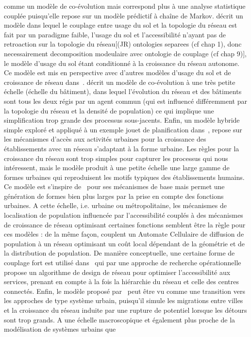 {comme un modèle de co-évolution mais correspond plus à une analyse statistique couplée  puisqu'elle repose sur un modèle prédictif à chaîne de Markov. \cite{rui2011urban} décrit un modèle dans lequel le couplage entre usage du sol et la topologie du réseau est fait par un paradigme faible, l'usage du sol et l'accessibilité n'ayant pas de retroaction sur la topologie du réseau[(JR) ontologies separees (cf chap 1), donc necessairement decomposition modeulaire avec ontologie de couplage (cf chap 9)], le modèle d'usage du sol étant conditionné à la croissance du réseau autonome. Ce modèle est mis en perspective avec d'autres modèles d'usage du sol et de croissance de réseau dans~\cite{rui2013urban}. \cite{achibet2014model} décrit un modèle de co-évolution à une très petite échelle (échelle du bâtiment), dans lequel l'évolution du réseau et des bâtiments sont tous les deux régis par un agent commun (qui est influencé différemment par la topologie du réseau et la densité de population) ce qui implique une simplification trop grande des processus sous-jacents. Enfin, un modèle hybride simple exploré et appliqué à un exemple jouet de planification dans~\cite{raimbault2014hybrid}, repose sur les mécanismes d'accès aux activités urbaines pour la croissance des établissements avec un réseau s'adaptant à la forme urbaine. Les règles pour la croissance du réseau sont trop simples pour capturer les processus qui nous intéressent, mais le modèle produit à une petite échelle une large gamme de formes urbaines qui reproduisent les motifs typiques des établissements humains. Ce modèle est s'inspire de~\cite{moreno2012automate} pour ses mécanismes de base mais permet une génération de formes bien plus larges par la prise en compte des fonctions urbaines. A cette échelle, i.e. urbaine ou métropolitaine, les mécanismes de localisation de population influencée par l'accessibilité couplés à des mécanismes de croissance de réseau optimisant certaines fonctions semblent être la règle pour ces modèles : de la même façon, \cite{wu2017city} couplent un Automate Cellulaire de diffusion de population à un réseau optimisant un coût local dépendant de la géométrie et de la distribution de population. De manière conceptuelle, une certaine forme de couplage fort est utilisé dans~\cite{bigotte2010integrated} qui par une approche de recherche opérationnelle propose un algorithme de design de réseau pour optimiser l'accessibilité aux services, prenant en compte à la fois la hiérarchie du réseau et celle des centres connectés. Enfin, le modèle proposé par~\cite{blumenfeld2010network} peut être vu comme une transition vers les approches de type système urbain, puisqu'il simule les migrations entre villes et la croissance du réseau induite par une rupture de potentiel lorsque les détours sont trop grands. A une échelle macroscopique et également plus proche de la modélisation de systèmes urbains que }
